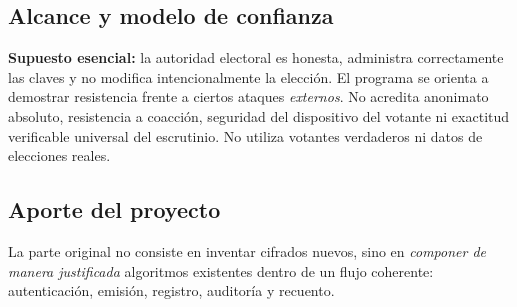 \subsection{Alcance y modelo de confianza}
\textbf{Supuesto esencial:} la autoridad electoral es honesta, administra correctamente las claves y no modifica intencionalmente la elección. El programa se orienta a demostrar resistencia frente a ciertos ataques \emph{externos}. No acredita anonimato absoluto, resistencia a coacción, seguridad del dispositivo del votante ni exactitud verificable universal del escrutinio. No utiliza votantes verdaderos ni datos de elecciones reales.

\subsection{Aporte del proyecto}
La parte original no consiste en inventar cifrados nuevos, sino en \emph{componer de manera justificada} algoritmos existentes dentro de un flujo coherente: autenticación, emisión, registro, auditoría y recuento.
